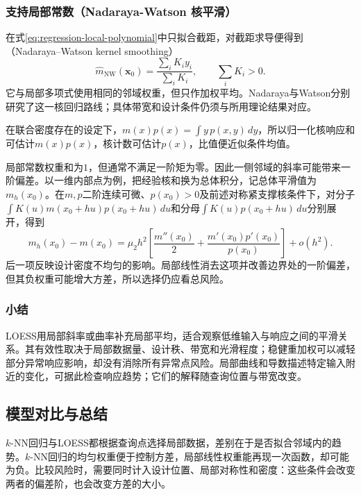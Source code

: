 \subsubsection{支持局部常数（Nadaraya-Watson 核平滑）}
\label{sec:regression-nadaraya-watson}

在式\eqref{eq:regression-local-polynomial}中只拟合截距，对截距求导便得到（Nadaraya--Watson kernel smoothing）
\begin{equation}
  \widehat m_{\mathrm{NW}}(\bm{x}_0)
  =\frac{\sum_iK_i y_i}{\sum_iK_i},
  \qquad \sum_iK_i>0.
  \label{eq:regression-nw}
\end{equation}
它与局部多项式使用相同的邻域权重，但只作加权平均。Nadaraya与Watson分别研究了这一核回归路线；具体带宽和设计条件仍须与所用理论结果对应。

在联合密度存在的设定下，$m(x)p(x)=\int y\,p(x,y)\,dy$，所以归一化核响应和可估计$m(x)p(x)$，核计数可估计$p(x)$，比值便近似条件均值。

局部常数权重和为$1$，但通常不满足一阶矩为零。因此一侧邻域的斜率可能带来一阶偏差。以一维内部点为例，把经验核和换为总体积分，记总体平滑值为$m_h(x_0)$。在$m,p$二阶连续可微、$p(x_0)>0$及前述对称紧支撑核条件下，对分子$\int K(u)m(x_0+hu)p(x_0+hu)\,du$和分母$\int K(u)p(x_0+hu)\,du$分别展开，得到
\[
  m_h(x_0)-m(x_0)
  =\mu_2h^2\left[\frac{m''(x_0)}{2}
       +\frac{m'(x_0)p'(x_0)}{p(x_0)}\right]+o(h^2).
\]
后一项反映设计密度不均匀的影响。局部线性消去这项并改善边界处的一阶偏差，但其负权重可能增大方差，所以选择仍应看总风险。

\subsubsection{小结}

LOESS用局部斜率或曲率补充局部平均，适合观察低维输入与响应之间的平滑关系。其有效性取决于局部数据量、设计秩、带宽和光滑程度；稳健重加权可以减轻部分异常响应影响，却没有消除所有异常点风险。局部曲线和导数描述特定输入附近的变化，可据此检查响应趋势；它们的解释随查询位置与带宽改变。

\subsection{模型对比与总结}

$k$-NN回归与LOESS都根据查询点选择局部数据，差别在于是否拟合邻域内的趋势。$k$-NN回归的均匀权重便于控制方差，局部线性权重能再现一次函数，却可能为负。比较风险时，需要同时计入设计位置、局部对称性和密度：这些条件会改变两者的偏差阶，也会改变方差的大小。

